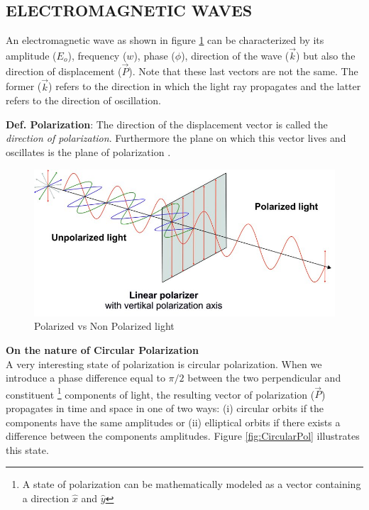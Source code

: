\label{sec:TEO_FRAMEWORK}
\subsection{ELECTROMAGNETIC WAVES}
An electromagnetic wave as shown in figure \ref{fig:PolvNPol} can be characterized by its amplitude ($E_o$), frequency ($w$), phase ($\phi$), direction of the wave ($\Vec{k}$) but also the direction of displacement ($\Vec{P}$). Note that these last vectors are not the same. The former ($\Vec{k}$) refers to the direction in which the light ray propagates and the latter refers to the direction of oscillation. 

\textbf{Def. Polarization}: The direction of the displacement vector is called the \textit{direction of polarization}. Furthermore the plane on which this vector lives and oscillates is the plane of polarization \cite{guenther2015modern}. 
\begin{figure}[H]
    \centering
    \includegraphics[scale=0.80]{Figures/Polarization_NonPolarization.jpg}
    \caption{Polarized vs Non Polarized light \cite{Pol-figure}}
    \label{fig:PolvNPol}
\end{figure}

\textbf{On the nature of Circular Polarization}\\
A very interesting state of polarization is circular polarization. When we introduce a phase difference equal to $\pi/2$ between the two perpendicular and constituent \footnote{A state of polarization can be mathematically modeled as a vector containing a direction $\hat{x}$ and $\hat{y}$} components of light, the resulting vector of polarization ($\Vec{P}$) propagates in time and space in one of two ways: (i) circular orbits if the components have the same amplitudes or (ii) elliptical orbits if there exists a difference between the components amplitudes. Figure \ref{fig:CircularPol} illustrates this state.

